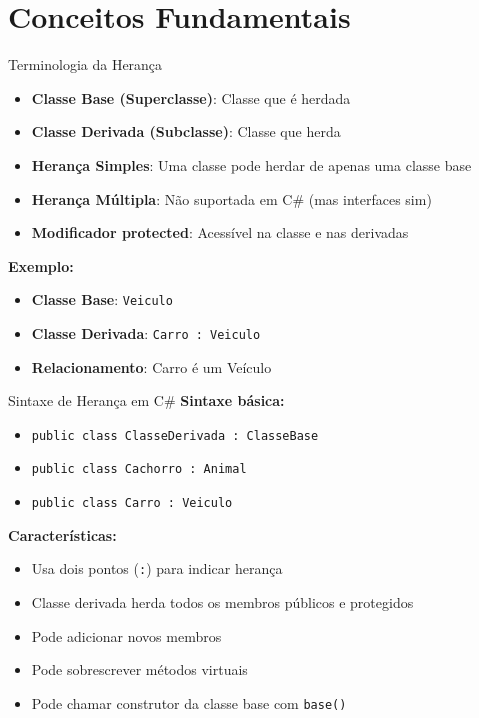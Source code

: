 \documentclass[aspectratio=169]{beamer}
\begin{document}
\section{Conceitos Fundamentais}

\begin{frame}{Terminologia da Herança}
\begin{itemize}
\item \textbf{Classe Base (Superclasse)}: Classe que é herdada
\item \textbf{Classe Derivada (Subclasse)}: Classe que herda
\item \textbf{Herança Simples}: Uma classe pode herdar de apenas uma classe base
\item \textbf{Herança Múltipla}: Não suportada em C\# (mas interfaces sim)
\item \textbf{Modificador protected}: Acessível na classe e nas derivadas
\end{itemize}

\vspace{0.3cm}
\textbf{Exemplo:}
\begin{itemize}
\item \textbf{Classe Base}: \texttt{Veiculo}
\item \textbf{Classe Derivada}: \texttt{Carro : Veiculo}
\item \textbf{Relacionamento}: Carro é um Veículo
\end{itemize}
\end{frame}

\begin{frame}{Sintaxe de Herança em C\#}
\textbf{Sintaxe básica:}
\begin{itemize}
\item \texttt{public class ClasseDerivada : ClasseBase}
\item \texttt{public class Cachorro : Animal}
\item \texttt{public class Carro : Veiculo}
\end{itemize}

\vspace{0.5cm}
\textbf{Características:}
\begin{itemize}
\item Usa dois pontos (\texttt{:}) para indicar herança
\item Classe derivada herda todos os membros públicos e protegidos
\item Pode adicionar novos membros
\item Pode sobrescrever métodos virtuais
\item Pode chamar construtor da classe base com \texttt{base()}
\end{itemize}
\end{frame}
\end{document}

